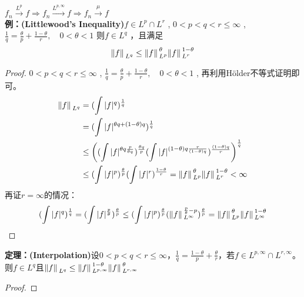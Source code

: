$f_n\xrightarrow{L^p}f\Rightarrow f_n\xrightarrow{L^{p,\infty}}f\Rightarrow f_n\xrightarrow{\mu}f$
\\
{\bfseries \large 例：(Littlewood's Inequality)}$f\in L^p\cap L^r$ , $0<p<q<r\leq \infty$ , $\frac{1}{q}=\frac{\theta}{p}+\frac{1-\theta}{r},\quad 0<\theta<1$ 则$f\in L^q$ ，且满足
\begin{equation*}
    \norm*{f}_{L^q}\leq \norm*{f}_{L^p}^{\theta}\norm*{f}_{L^r}^{1-\theta}
\end{equation*}
\begin{proof}
    $0<p<q<r\leq \infty$ , $\frac{1}{q}=\frac{\theta}{p}+\frac{1-\theta}{r},\quad 0<\theta<1$ , 再利用H{\"o}lder不等式证明即可。
    \\
    \begin{equation*}
        \begin{aligned}
            \norm*{f}_{L^q}&=(\int|f|^q)^{\frac{1}{q}}\\
            & =(\int |f|^{\theta q+(1-\theta)q})^{\frac{1}{q}}\\
            & \leq \left((\int|f|^{\theta q \frac{p}{\theta q}})^{\frac{\theta q}{p}} (\int|f|^{(1-\theta) q \frac{r}{(1-\theta)q}})^{\frac{(1-\theta) q}{r}}\right)^{\frac{1}{q}}\\
            &\leq  (\int |f|^p)^{\frac{\theta}{p}} (\int |f|^r)^{\frac{1-\theta}{r}}=\norm*{f}_{L^p}^{\theta}\norm*{f}_{L^r}^{1-\theta} <\infty
        \end{aligned}
    \end{equation*}
    再证$r=\infty$的情况：
    \begin{equation*}
        (\int|f|^q)^{\frac{1}{q}}=(\int|f|^{\frac{p}{\theta}})^{\frac{\theta}{p}}\leq (\int|f|^p)^{\frac{\theta}{p}}(\norm*{f}_{L^{\infty}}^{\frac{p}{\theta}-p})^{\frac{\theta}{p}}=\norm*{f}_{L^p}^{\theta}\norm*{f}_{L^\infty}^{1-\theta}
    \end{equation*}
\end{proof}

{\bfseries \large 定理：(Interpolation)}设$0<p<q<r\leq \infty$，$\frac{1}{q}=\frac{1-\theta}{p}+\frac{\theta}{r}$，若$f\in L^{p,\infty}\cap L^{r,\infty}$。则$f\in L^q$且$\norm*{f}_{L^q}\leq \norm*{f}_{L^{p,\infty}}^{1-\theta}\norm*{f}_{L^{r,\infty}}^{\theta}$

\begin{proof}
    
\end{proof}


